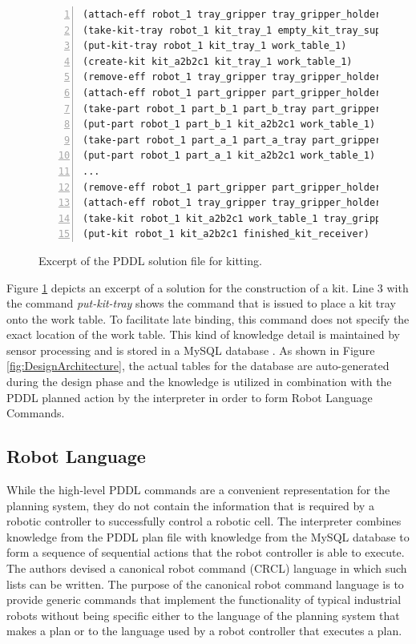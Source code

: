 \begin{figure}[t!h!]
\begin{minipage}{.5\paperwidth}
\begin{list}{}{\setlength{\leftmargin}{1em}}\item\small
\begin{Verbatim}[commandchars=\\\{\},fontsize=\scriptsize, numbers=left, numbersep=2pt]
(attach-eff robot_1 tray_gripper tray_gripper_holder)
(take-kit-tray robot_1 kit_tray_1 empty_kit_tray_supply tray_gripper work_table_1)
(put-kit-tray robot_1 kit_tray_1 work_table_1)
(create-kit kit_a2b2c1 kit_tray_1 work_table_1)
(remove-eff robot_1 tray_gripper tray_gripper_holder)
(attach-eff robot_1 part_gripper part_gripper_holder)
(take-part robot_1 part_b_1 part_b_tray part_gripper work_table_1 kit_a2b2c1)
(put-part robot_1 part_b_1 kit_a2b2c1 work_table_1)
(take-part robot_1 part_a_1 part_a_tray part_gripper work_table_1 kit_a2b2c1)
(put-part robot_1 part_a_1 kit_a2b2c1 work_table_1)
...
(remove-eff robot_1 part_gripper part_gripper_holder)
(attach-eff robot_1 tray_gripper tray_gripper_holder)
(take-kit robot_1 kit_a2b2c1 work_table_1 tray_gripper)
(put-kit robot_1 kit_a2b2c1 finished_kit_receiver)
\end{Verbatim}
\end{list}
\end{minipage}
\caption{Excerpt of the PDDL solution file for kitting.}
\label{fig:Solution}
\end{figure}
Figure \ref{fig:Solution} depicts an excerpt of a solution for
the construction of a kit. Line 3 with the command {\it put-kit-tray}
shows the command that is issued to place
a kit tray onto the work table. To facilitate late binding, this
command does not specify the exact location of the work table.
This kind of knowledge detail is maintained by sensor processing
and is stored in a MySQL database \cite{MySQL}. As shown
in Figure \ref{fig:DesignArchitecture}, the actual tables 
for the database are auto-generated during the design phase and the
knowledge is utilized in combination with the PDDL planned action by
the interpreter in order to form Robot Language Commands.

\subsection{Robot Language}
While the high-level PDDL commands are a convenient representation
for the planning system, they do not contain the information that is
required by a robotic controller to successfully control a robotic cell.
The interpreter combines knowledge from the PDDL plan file with 
knowledge from the MySQL database to form a sequence of sequential
actions that the robot controller is able to execute. 
The authors devised a canonical robot
command (CRCL) language in which such lists can be written. The purpose of the
canonical robot command language is to provide generic commands that
implement the functionality of typical industrial robots without being
specific either to the language of the planning system that makes a plan or
to the language used by a robot controller that executes a plan.

